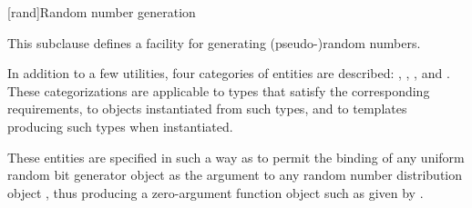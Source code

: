 

[rand]{Random number generation}

%
%
%
%

\pnum
This subclause defines a facility
for generating (pseudo-)random numbers.

\pnum
In addition to a few utilities,
four categories of entities are described:
,
,
,
and
.
These categorizations are applicable
to types that satisfy the corresponding requirements,
to objects instantiated from such types,
and to templates producing such types when instantiated.
\begin{note}
 These entities are specified in such a way
 as to permit the binding
 of any uniform random bit generator object 
 as the argument
 to any random number distribution object ,
 thus producing a zero-argument function object
 such as given by
 .
\end{note}

